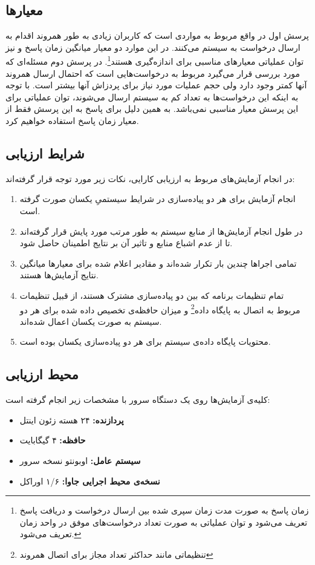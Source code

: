 \subsection{معیارها}
پرسش اول در واقع مربوط به مواردی است که کاربران زیادی به طور همروند اقدام به ارسال درخواست به سیستم می‌کنند. در این موارد دو معیار میانگین زمان پاسخ و نیز \gls{توان عملیاتی} معیارهای مناسبی برای اندازه‌گیری هستند\footnote{زمان پاسخ به صورت مدت زمان سپری شده بین ارسال درخواست و دریافت پاسخ تعریف می‌شود و توان عملیاتی به صورت تعداد درخواست‌های موفق در واحد زمان تعریف می‌شود.}.
 در پرسش دوم مسئله‌ای که مورد بررسی قرار می‌گیرد مربوط به درخواست‌هایی است که احتمال ارسال همروند آنها کمتر وجود دارد ولی حجم عملیات مورد نیاز برای پردزاش آنها بیشتر است. با توجه به اینکه این درخواست‌ها به تعداد کم به سیستم ارسال می‌شوند، توان عملیاتی برای این پرسش معیار مناسبی نمی‌باشد. به همین دلیل برای پاسخ به این پرسش فقط از معیار زمان پاسخ استفاده خواهیم کرد.

\subsection{شرایط ارزیابی}
در انجام آزمایش‌های مربوط به ارزیابی کارایی، نکات زیر مورد توجه قرار گرفته‌اند:
\begin{enumerate}
\item انجام آزمایش برای هر دو پیاده‌سازی در شرایط سیستمیِ یکسان صورت گرفته است.
\item در طول انجام آزمایش‌ها از منابع سیستم به طور مرتب مورد پایش قرار گرفته‌اند تا از عدم اشباع منابع و تاثیر آن بر نتایج اطمینان حاصل شود.
\item تمامی اجراها چندین بار تکرار شده‌اند و مقادیر اعلام شده برای معیارها میانگین نتایج آزمایش‌ها هستند.
\item تمام تنظیمات برنامه که بین دو پیاده‌سازی مشترک هستند، از قبیل تنظیمات مربوط به اتصال به پایگاه داده\footnote{تنظیماتی مانند حداکثر تعداد مجاز برای اتصال همروند} و میزان حافظه‌ی تخصیص داده شده برای هر دو سیستم به صورت یکسان اعمال شده‌اند.  
\item محتویات پایگاه داده‌ی سیستم برای هر دو پیاده‌سازی یکسان بوده است.
\end{enumerate}
\subsection{محیط ارزیابی}
کلیه‌ی آزمایش‌ها روی یک دستگاه سرور با مشخصات زیر انجام گرفته است:
\begin{itemize}
\item[] \textbf{پردازنده:} ۲۴ هسته زئون اینتل
\item[] \textbf{حافظه:} ۴ گیگابایت
\item[] \textbf{سیستم عامل:} اوبونتو نسخه سرور
\item[] \textbf{نسخه‌ی محیط اجرایی جاوا:} ۱/۶ اوراکل
\end{itemize}
